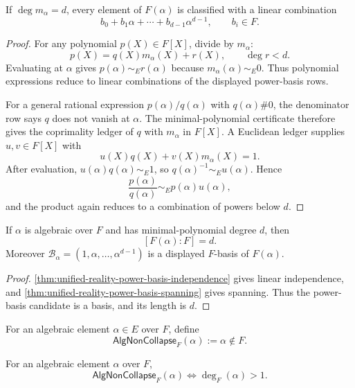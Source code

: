 \begin{theorem}
\label{thm:unified-reality-power-basis-spanning}
If $\deg m_\alpha=d$, every element of $F(\alpha)$ is classified with a
linear combination
$$
b_0+b_1\alpha+\cdots+b_{d-1}\alpha^{d-1},
\qquad
b_i\in F.
$$
\end{theorem}

\begin{proof}
For any polynomial $p(X)\in F[X]$, divide by $m_\alpha$:
$$
p(X)=q(X)m_\alpha(X)+r(X),
\qquad
\deg r<d.
$$
Evaluating at $\alpha$ gives $p(\alpha)\sim_Er(\alpha)$ because
$m_\alpha(\alpha)\sim_E0$. Thus polynomial expressions reduce to
linear combinations of the displayed power-basis rows.

For a general rational expression $p(\alpha)/q(\alpha)$ with
$q(\alpha)\#0$, the denominator row says $q$ does not vanish at
$\alpha$. The minimal-polynomial certificate therefore gives the
coprimality ledger of $q$ with $m_\alpha$ in $F[X]$. A Euclidean ledger
supplies $u,v\in F[X]$ with
$$
u(X)q(X)+v(X)m_\alpha(X)=1.
$$
After evaluation, $u(\alpha)q(\alpha)\sim_E1$, so
$q(\alpha)^{-1}\sim_Eu(\alpha)$. Hence
$$
\frac{p(\alpha)}{q(\alpha)}
\sim_E
p(\alpha)u(\alpha),
$$
and the product again reduces to a combination of powers below $d$.
\end{proof}

\begin{theorem}
\label{thm:unified-reality-algebraic-extension-dimension}
If $\alpha$ is algebraic over $F$ and has minimal-polynomial degree
$d$, then
$$
[F(\alpha):F]=d.
$$
Moreover $\mathcal B_\alpha=(1,\alpha,\ldots,\alpha^{d-1})$ is a
displayed $F$-basis of $F(\alpha)$.
\end{theorem}

\begin{proof}
\autoref{thm:unified-reality-power-basis-independence} gives linear
independence, and
\autoref{thm:unified-reality-power-basis-spanning} gives spanning. Thus
the power-basis candidate is a basis, and its length is $d$.
\end{proof}

\begin{definition}
\label{def:unified-reality-algebraic-noncollapse}
For an algebraic element $\alpha\in E$ over $F$, define
$$
\mathsf{AlgNonCollapse}_F(\alpha)
:=
\alpha\notin F.
$$
\end{definition}

\begin{theorem}
\label{thm:unified-reality-algebraic-noncollapse-degree}
For an algebraic element $\alpha$ over $F$,
$$
\mathsf{AlgNonCollapse}_F(\alpha)
\Longleftrightarrow
\deg_F(\alpha)>1.
$$
\end{theorem}

